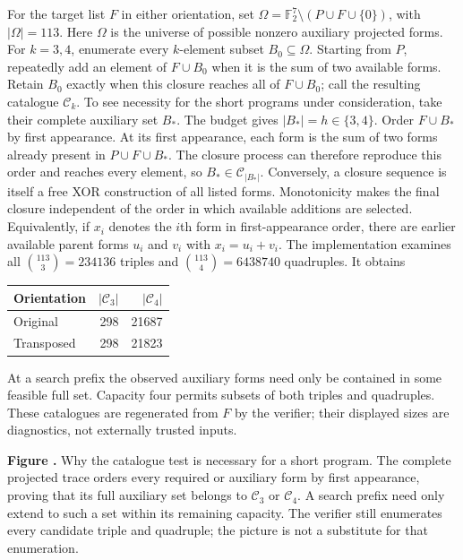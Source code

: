 \documentclass[11pt]{article}
\newcommand{\F}{\mathbb F_2}
\newcommand{\prooffigure}[3]{%
  \begin{center}
  \begin{minipage}{.98\linewidth}
  \centering
  \resizebox{\linewidth}{!}{}\par
  \refstepcounter{figure}\label{#2}%
  \small\textbf{Figure \thefigure.} #3
  \end{minipage}
  \end{center}}
\begin{document}
For the target list $F$ in either orientation, set
$\Omega=\F^7\setminus(P\cup F\cup\{0\})$, with $|\Omega|=113$.
Here $\Omega$ is the universe of possible nonzero auxiliary projected forms.
For $k=3,4$, enumerate every $k$-element subset $B_0\subseteq\Omega$.
Starting from $P$, repeatedly add an element of $F\cup B_0$ when it is
the sum of two available forms. Retain $B_0$ exactly when this closure
reaches all of $F\cup B_0$; call the resulting catalogue $\mathcal C_k$.
To see necessity for the short programs under consideration, take their
complete auxiliary set $B_*$. The budget gives $|B_*|=h\in\{3,4\}$. Order
$F\cup B_*$ by first appearance. At its first appearance,
each form is the sum of two forms already present in
$P\cup F\cup B_*$. The closure process can therefore reproduce this order
and reaches every element, so $B_*\in\mathcal C_{|B_*|}$. Conversely, a
closure sequence is itself a free XOR construction of all listed forms.
Monotonicity makes the final closure independent of the order in which
available additions are selected.
Equivalently, if $x_i$ denotes the $i$th form in first-appearance order,
there are earlier available parent forms $u_i$ and $v_i$ with
$x_i=u_i+v_i$.
The implementation examines all $\binom{113}{3}=234136$ triples and
$\binom{113}{4}=6438740$ quadruples. It obtains
\begin{center}\begin{tabular}{lrr}\toprule
Orientation&$|\mathcal C_3|$&$|\mathcal C_4|$\\\midrule
Original&298&21687\\Transposed&298&21823\\\bottomrule
\end{tabular}\end{center}
At a search prefix the observed auxiliary forms need only be contained
in some feasible full set. Capacity four permits subsets of both triples
and quadruples. These catalogues are regenerated from $F$ by the verifier;
their displayed sizes are diagnostics, not externally trusted inputs.
\prooffigure{catalogue_closure}{fig:catalogue-closure}{Why the catalogue test
is necessary for a short program. The complete projected trace orders every
required or auxiliary form by first appearance, proving that its full
auxiliary set belongs to $\mathcal C_3$ or $\mathcal C_4$. A search prefix
need only extend to such a set within its remaining capacity. The verifier
still enumerates every candidate triple and quadruple; the picture is not a
substitute for that enumeration.}
\end{document}
